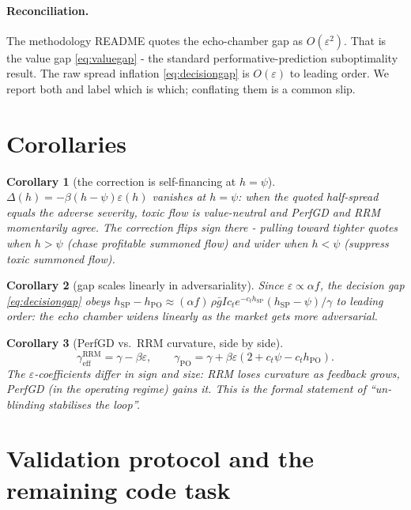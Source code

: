 \documentclass[11pt]{article}
\newtheorem{corollary}{Corollary}
\newcommand{\eps}{\varepsilon}
\newcommand{\gbar}{\bar g}
\newcommand{\hSP}{h_{\mathrm{SP}}}
\newcommand{\hPO}{h_{\mathrm{PO}}}
\newcommand{\gPO}{\gamma_{\mathrm{PO}}}
\begin{document}
\paragraph{Reconciliation.}
The methodology README quotes the echo-chamber gap as $O(\eps^2)$. That is the
value gap \eqref{eq:valuegap} - the standard performative-prediction
suboptimality result. The raw spread inflation \eqref{eq:decisiongap} is
$O(\eps)$ to leading order. We report both and label which is which; conflating
them is a common slip.

\section{Corollaries}

\begin{corollary}[the correction is self-financing at $h=\psi$]
$\Delta(h)=-\beta(h-\psi)\eps(h)$ vanishes at $h=\psi$: when the quoted
half-spread equals the adverse severity, toxic flow is value-neutral and PerfGD
and RRM momentarily agree. The correction flips sign there - pulling toward
tighter quotes when $h>\psi$ (chase profitable summoned flow) and wider when
$h<\psi$ (suppress toxic summoned flow).
\end{corollary}

\begin{corollary}[gap scales linearly in adversariality]
Since $\eps\propto\alpha f$, the decision gap \eqref{eq:decisiongap} obeys
$\hSP-\hPO\approx(\alpha f)\,\rho\gbar I c_t e^{-c_t\hSP}(\hSP-\psi)/\gamma$ to
leading order: the echo chamber widens linearly as the market gets more
adversarial.
\end{corollary}

\begin{corollary}[PerfGD vs.\ RRM curvature, side by side]
\begin{equation*}
  \gamma_{\mathrm{eff}}^{\mathrm{RRM}} = \gamma-\beta\eps,
  \qquad
  \gPO = \gamma + \beta\eps(2+c_t\psi-c_t\hPO).
\end{equation*}
The $\eps$-coefficients differ in sign and size: RRM loses curvature as feedback
grows, PerfGD (in the operating regime) gains it. This is the formal statement of
``un-blinding stabilises the loop''.
\end{corollary}

\section{Validation protocol and the remaining code task}
\end{document}
